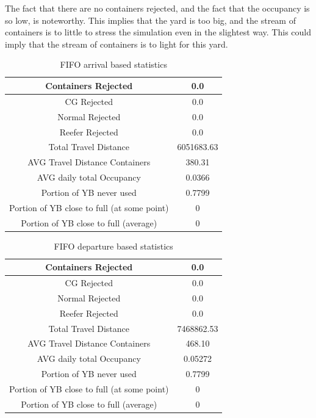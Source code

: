 \documentclass[]{article}
\begin{document}
The fact that there are no containers rejected, and the fact that the occupancy
is so low, is noteworthy. This implies that the yard is too big, and the stream
of containers is to little to stress the simulation even in the slightest way.
This could imply that the stream of containers is to light for this yard.
\begin{table}[h]
	\centering
	\begin{tabular}{|c|c|}
		\hline
		Containers Rejected                         & 0.0        \\ \hline
		CG Rejected                                 & 0.0        \\ \hline
		Normal Rejected                             & 0.0        \\ \hline
		Reefer Rejected                             & 0.0        \\ \hline
		Total Travel Distance                       & 6051683.63 \\ \hline
		AVG Travel Distance Containers              & 380.31     \\ \hline
		AVG daily total Occupancy                   & 0.0366     \\ \hline
		Portion of YB never used                    & 0.7799     \\ \hline
		Portion of YB close to full (at some point) & 0          \\ \hline
		Portion of YB close to full (average)       & 0          \\ \hline
	\end{tabular}
	\caption{FIFO arrival based statistics}
\end{table}
\begin{table}[h]
	\centering
	\begin{tabular}{|c|c|}
		\hline
		Containers Rejected                         & 0.0        \\ \hline
		CG Rejected                                 & 0.0        \\ \hline
		Normal Rejected                             & 0.0        \\ \hline
		Reefer Rejected                             & 0.0        \\ \hline
		Total Travel Distance                       & 7468862.53 \\ \hline
		AVG Travel Distance Containers              & 468.10     \\ \hline
		AVG daily total Occupancy                   & 0.05272    \\ \hline
		Portion of YB never used                    & 0.7799     \\ \hline
		Portion of YB close to full (at some point) & 0          \\ \hline
		Portion of YB close to full (average)       & 0          \\ \hline
	\end{tabular}
	\caption{FIFO departure based statistics}
\end{table}
\end{document}

